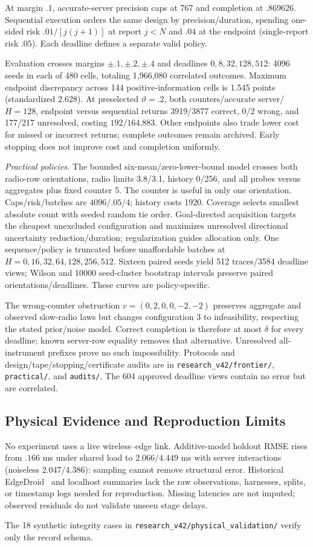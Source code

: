 At margin $.1$, accurate-server precision caps at 767 and completion at $.869626$. Sequential execution orders the same design by precision/duration, spending one-sided risk $.01/[j(j+1)]$ at report $j<N$ and $.04$ at the endpoint (single-report risk $.05$). Each deadline defines a separate valid policy.

Evaluation crosses margins $\pm.1,\pm.2,\pm.4$ and deadlines $0,8,32,128,512$: 4096 seeds in each of 480 cells, totaling 1,966,080 correlated outcomes. Maximum endpoint discrepancy across 144 positive-information cells is 1.545 points (standardized 2.628). At preselected $\vartheta=.2$, both counters/accurate server/$H=128$, endpoint versus sequential returns 3919/3877 correct, 0/2 wrong, and 177/217 unresolved, costing $192/164.883$. Other endpoints also trade lower cost for missed or incorrect returns; complete outcomes remain archived. Early stopping does not improve cost and completion uniformly.

\emph{Practical policies.} The bounded six-mean/zero-lower-bound model crosses both radio-row orientations, radio limits 3.8/3.1, history 0/256, and all probes versus aggregates plus fixed counter 5. The counter is useful in only one orientation. Caps/risk/batches are $4096/.05/4$; history costs 1920. Coverage selects smallest absolute count with seeded random tie order. Goal-directed acquisition targets the cheapest unexcluded configuration and maximizes unresolved directional uncertainty reduction/duration; regularization guides allocation only. One sequence/policy is truncated before unaffordable batches at $H=0,16,32,64,128,256,512$. Sixteen paired seeds yield 512 traces/3584 deadline views; Wilson and 10000 seed-cluster bootstrap intervals preserve paired orientations/deadlines. These curves are policy-specific.

The wrong-counter obstruction $v=(0,2,0,0,-2,-2)$ preserves aggregate and observed slow-radio laws but changes configuration 3 to infeasibility, respecting the stated prior/noise model. Correct completion is therefore at most $\delta$ for every deadline; known server-row equality removes that alternative. Unresolved all-instrument prefixes prove no such impossibility. Protocols and design/tape/stopping/certificate audits are in \texttt{research\_v42/frontier/}, \texttt{practical/}, and \texttt{audits/}. The 604 approved deadline views contain no error but are correlated.

\subsection{Physical Evidence and Reproduction Limits}
\label{app:deployment-protocol}
No experiment uses a live wireless--edge link. Additive-model holdout RMSE rises from $.166$ ms under shared load to $2.066/4.449$ ms with server interactions (noiseless $2.047/4.386$): sampling cannot remove structural error. Historical EdgeDroid~\cite{edgedroid2019} and localhost summaries lack the raw observations, harnesses, splits, or timestamp logs needed for reproduction. Missing latencies are not imputed; observed residuals do not validate unseen stage delays.

The 18 synthetic integrity cases in \texttt{research\_v42/physical\_validation/} verify only the record schema.
